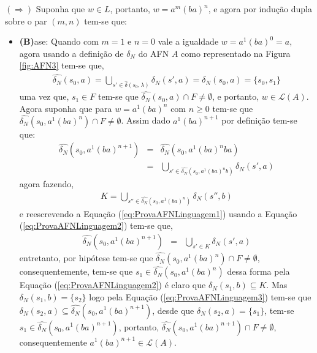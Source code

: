 \begin{prova}
	$(\Rightarrow)$ Suponha que $w \in L$, portanto, $w = a^m(ba)^n$,  e agora por indução dupla sobre o par $(m,n)$ tem-se que:
	\begin{itemize}
		\item[ ] \textbf{(B)}ase: Quando com $m = 1$ e $n = 0$ vale a igualdade $w = a^1(ba)^0 = a$, agora usando a definição de $\delta_N$ do AFN $A$ como representado na Figura \ref{fig:AFN3} tem-se que, 
		\begin{eqnarray*}
			\widehat{\delta_N}(s_0, a) = \bigcup_{s' \in \widehat{\delta}(s_0, \lambda)} \delta_N(s', a) = \delta_N(s_0, a) = \{s_0, s_1\}
		\end{eqnarray*}
		uma vez que, $s_1 \in F$ tem-se que $\widehat{\delta_N}(s_0, a) \cap F \neq \emptyset$, e portanto, $w \in \mathcal{L}(A)$. Agora suponha que para $w = a^1(ba)^n$ com $n \geq 0$ tem-se que $\widehat{\delta_N}(s_0, a^1(ba)^n) \cap F \neq \emptyset$. Assim dado $a^1(ba)^{n+1}$ por definição tem-se que:
		\begin{eqnarray}\label{eq:ProvaAFNLinguagem1}
			\widehat{\delta_N}(s_0, a^1(ba)^{n+1}) & = & \widehat{\delta_N}(s_0, a^1(ba)^{n}ba)\nonumber\\
			& = & \bigcup_{s' \in \widehat{\delta_N}(s_0, a^1(ba)^{n}b)} \delta_N(s', a)
		\end{eqnarray}
		agora fazendo,
		\begin{eqnarray}\label{eq:ProvaAFNLinguagem2}
			K = \bigcup_{s'' \in \widehat{\delta_N}(s_0, a^1(ba)^{n})} \delta_N(s'', b)
		\end{eqnarray}
		e reescrevendo a Equação (\ref{eq:ProvaAFNLinguagem1}) usando a Equação (\ref{eq:ProvaAFNLinguagem2}) tem-se que,
		\begin{eqnarray}\label{eq:ProvaAFNLinguagem3}
			\widehat{\delta_N}(s_0, a^1(ba)^{n+1}) & = & \bigcup_{s' \in K} \delta_N(s', a)
		\end{eqnarray}
		entretanto, por hipótese tem-se que $\widehat{\delta_N}(s_0, a^1(ba)^n) \cap F \neq \emptyset$, consequentemente, tem-se que $s_1 \in \widehat{\delta_N}(s_0, a^1(ba)^n)$ dessa forma pela Equação (\ref{eq:ProvaAFNLinguagem2}) é claro que $\delta_N(s_1, b) \subseteq K$. Mas $\delta_N(s_1, b) = \{s_2\}$ logo pela Equação (\ref{eq:ProvaAFNLinguagem3}) tem-se que $\delta_N(s_2, a) \subseteq \widehat{\delta_N}(s_0, a^1(ba)^{n+1})$, desde que $\delta_N(s_2, a) = \{s_1\}$, tem-se $s_1 \in \widehat{\delta_N}(s_0, a^1(ba)^{n+1})$, portanto, $\widehat{\delta_N}(s_0, a^1(ba)^{n+1}) \cap F \neq \emptyset$, consequentemente $a^1(ba)^{n+1} \in \mathcal{L}(A)$.


\end{itemize}
\end{prova}
